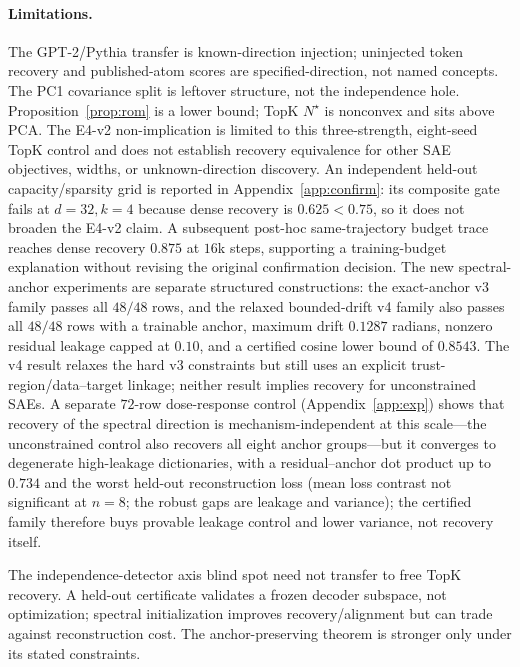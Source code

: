\documentclass{article}
\theoremstyle{plain}
\begin{document}
\paragraph{Limitations.}
The GPT-2/Pythia transfer is known-direction injection; uninjected token recovery and published-atom scores are specified-direction, not named concepts. The PC1 covariance split is leftover structure, not the independence hole. Proposition~\ref{prop:rom} is a lower bound; TopK $N^\star$ is nonconvex and sits above PCA. The E4-v2 non-implication is limited to this three-strength, eight-seed TopK control and does not establish recovery equivalence for other SAE objectives, widths, or unknown-direction discovery. An independent held-out capacity/sparsity grid is reported in Appendix~\ref{app:confirm}: its composite gate fails at $d{=}32,k{=}4$ because dense recovery is $0.625<0.75$, so it does not broaden the E4-v2 claim. A subsequent post-hoc same-trajectory budget trace reaches dense recovery $0.875$ at $16$k steps, supporting a training-budget explanation without revising the original confirmation decision. The new spectral-anchor experiments are separate structured constructions: the exact-anchor v3 family passes all $48/48$ rows, and the relaxed bounded-drift v4 family also passes all $48/48$ rows with a trainable anchor, maximum drift $0.1287$ radians, nonzero residual leakage capped at $0.10$, and a certified cosine lower bound of $0.8543$. The v4 result relaxes the hard v3 constraints but still uses an explicit trust-region/data--target linkage; neither result implies recovery for unconstrained SAEs. A separate $72$-row dose-response control (Appendix~\ref{app:exp}) shows that recovery of the spectral direction is mechanism-independent at this scale---the unconstrained control also recovers all eight anchor groups---but it converges to degenerate high-leakage dictionaries, with a residual--anchor dot product up to $0.734$ and the worst held-out reconstruction loss (mean loss contrast not significant at $n{=}8$; the robust gaps are leakage and variance); the certified family therefore buys provable leakage control and lower variance, not recovery itself.

\fi

The independence-detector axis blind spot need not transfer to free TopK recovery. A held-out certificate validates a frozen decoder subspace, not optimization; spectral initialization improves recovery/alignment but can trade against reconstruction cost. The anchor-preserving theorem is stronger only under its stated constraints.
\end{document}
